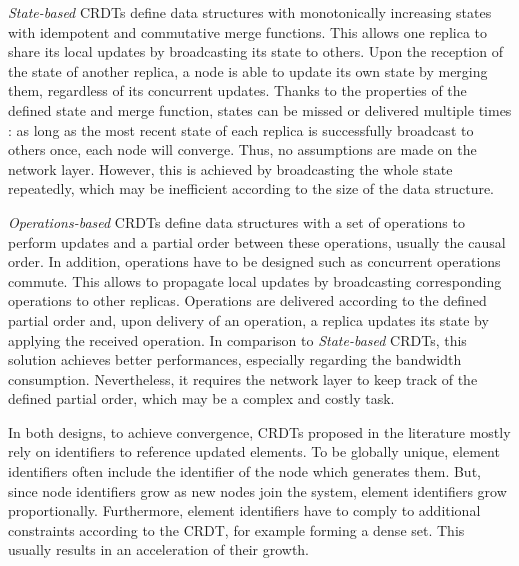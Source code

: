 \documentclass{article}
\begin{document}
\emph{State-based} \acp{CRDT} define data structures with monotonically increasing states with idempotent and commutative merge functions.
This allows one replica to share its local updates by broadcasting its state to others.
Upon the reception of the state of another replica, a node is able to update its own state by merging them,
regardless of its concurrent updates.
Thanks to the properties of the defined state and merge function, states can be missed or delivered multiple times :
as long as the most recent state of each replica is successfully broadcast to others once, each node will converge.
Thus, no assumptions are made on the network layer.
However, this is achieved by broadcasting the whole state repeatedly, which may be inefficient according to the size of the data structure.


\emph{Operations-based} \acp{CRDT} define data structures with a set of operations to perform updates
and a partial order between these operations, usually the causal order.
In addition, operations have to be designed such as concurrent operations commute.
This allows to propagate local updates by broadcasting corresponding operations to other replicas.
Operations are delivered according to the defined partial order and, upon delivery of an operation, a replica updates its state by applying the received operation.
In comparison to \emph{State-based} \acp{CRDT}, this solution achieves better performances, especially regarding the bandwidth consumption.
Nevertheless, it requires the network layer to keep track of the defined partial order, which may be a complex and costly task.


In both designs, to achieve convergence, \acp{CRDT} proposed in the literature mostly rely on identifiers to reference updated elements.
To be globally unique, element identifiers often include the identifier of the node which generates them.
But, since node identifiers grow as new nodes join the system, element identifiers grow proportionally.
Furthermore, element identifiers have to comply to additional constraints according to the \ac{CRDT}, for example forming a dense set.
This usually results in an acceleration of their growth.
\end{document}
